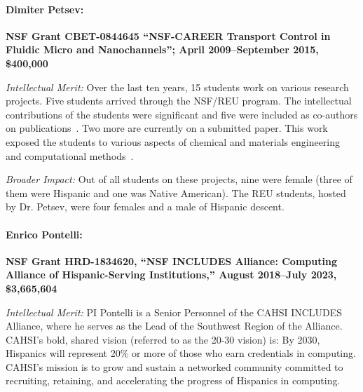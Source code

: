 \paragraph{Dimiter Petsev:}
\textbf{NSF Grant CBET-0844645 ``NSF-CAREER Transport Control in Fluidic Micro and Nanochannels''; April 2009--September 2015, \$400,000}

\noindent\textit{Intellectual Merit:}  Over the last ten years, 15 students work on various research projects. Five students arrived through the NSF/REU program. The intellectual contributions of the students were significant and five were included as co-authors on publications~\cite{petsev1,petsev2,petsev3,petsev4,petsev5,petsev5}. Two more are currently on a submitted paper. This work exposed the students to various aspects of chemical and materials engineering and computational methods~\cite{petsev7}.

\noindent\textit{Broader Impact:} Out of all students on these projects, nine were female (three of them were Hispanic and one was Native American). The REU students, hosted by Dr. Petsev, were four females and a male of Hispanic descent.    

\paragraph{Enrico Pontelli:}
\textbf{NSF Grant HRD-1834620, ``NSF INCLUDES Alliance: Computing Alliance of Hispanic-Serving Institutions,'' August 2018--July 2023, \$3,665,604}

\noindent \textit{Intellectual Merit:}
PI Pontelli is a Senior Personnel of the CAHSI INCLUDES Alliance, where he serves as the Lead of the Southwest Region of the Alliance. CAHSI’s bold, shared vision (referred to as the 20-30 vision) is:  By 2030, Hispanics will represent 20\% or more of those who earn credentials in computing. 
CAHSI’s mission is to grow and sustain a networked community committed to recruiting, retaining, and accelerating the progress of Hispanics in computing.


